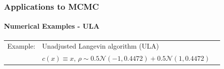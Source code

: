\documentclass[xcolor=dvipsnames, subsection=false]{beamer}
\def\alertb#1{\alert{\color{BrickRed}  #1}}
\def\alertb#1{\alert{\color{BrickRed}  #1}}
\def\normal{\mathcal{N}}
\newcommand{\pr}{\rho}
\begin{document}
\begin{frame}
\frametitle{Applications to MCMC}
\framesubtitle{Numerical Examples - ULA}
\begin{tabular}{lll}\alertb{Example:}   & Unadjusted Langevin algorithm (ULA)
	\\ & $c(x) \equiv x, \, \pr \sim 0.5 \normal(-1, 0.4472) + 0.5 \normal(1, 0.4472)$
\end{tabular}\\[-1.5em]
\begin{figure}
\centering
\mbox{
}
\end{figure}
\end{frame}
\end{document}
